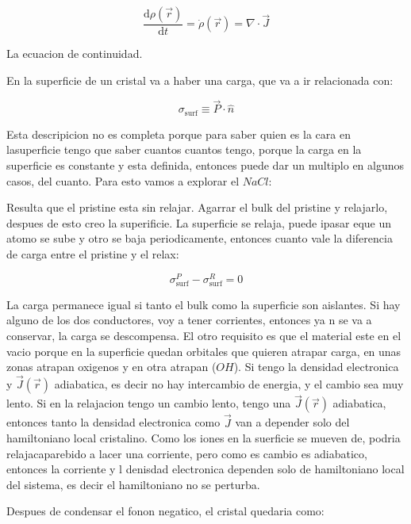 \documentclass[11pt,fleqn]{book}
\begin{document}
\begin{equation}
    \frac{\mathrm{d}\rho(\vec{r})}{\mathrm{d}t}=\dot{\rho}(\vec{r})=\nabla\cdot\vec{J}
\end{equation}

La ecuacion de continuidad. 

En la superficie de un cristal va a haber una carga, que va a ir relacionada con:

\begin{equation}
    \sigma_{\text{surf}}\equiv\vec{P}\cdot\hat{n}
\end{equation}

Esta descripicion no es completa porque para saber quien es la cara en lasuperficie tengo que saber cuantos cuantos tengo, porque la carga en la superficie es constante y esta definida, entonces puede dar un  multiplo en algunos casos, del cuanto. Para esto vamos a explorar el $NaCl$:


Resulta que el pristine esta sin relajar. Agarrar el bulk del pristine y relajarlo, despues de esto creo la superificie. La superficie se relaja, puede ipasar eque un atomo se sube y otro se baja periodicamente, entonces cuanto vale la diferencia de carga entre el pristine y el relax:

\begin{equation}
    \sigma_{\text{surf}}^{P}-\sigma_{\text{surf}}^{R}=0
\end{equation}

La carga permanece igual si tanto el bulk como la superficie son aislantes. Si hay alguno de los dos conductores, voy a tener corrientes, entonces ya n se va a conservar, la carga se descompensa. El otro requisito es que el material este en el vacio porque en la superficie quedan orbitales que quieren atrapar carga, en unas zonas atrapan oxigenos y en otra atrapan ($OH$). Si tengo la densidad electronica y $\vec{J}(\vec{r})$ adiabatica, es decir no hay intercambio de energia, y el cambio sea muy lento. Si en la relajacion tengo un cambio lento, tengo una $\vec{J}(\vec{r})$ adiabatica, entonces tanto la densidad electronica como $\vec{J}$ van a depender solo del hamiltoniano local cristalino. Como los iones en la suerficie se mueven de, podria  relajacaparebido a lacer una corriente, pero como es cambio es adiabatico, entonces la corriente y l denisdad electronica dependen solo de hamiltoniano local del sistema, es decir el hamiltoniano no se perturba. 

Despues de condensar el fonon negatico, el cristal quedaria como:
\end{document}
